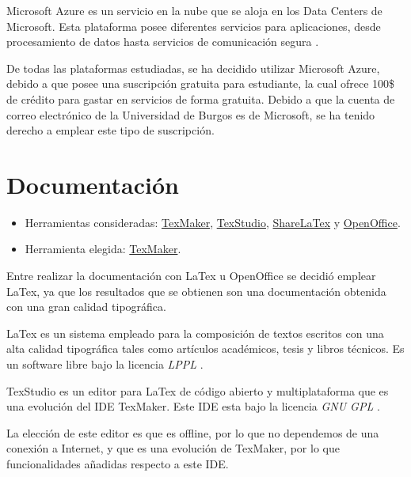 Microsoft Azure es un servicio en la nube que se aloja en los Data Centers de Microsoft. Esta plataforma posee diferentes servicios para aplicaciones, desde procesamiento de datos hasta servicios de comunicación segura \cite{azure:info}.

De todas las plataformas estudiadas, se ha decidido utilizar Microsoft Azure, debido a que posee una suscripción gratuita para estudiante, la cual ofrece 100\$ de crédito para gastar en servicios de forma gratuita. Debido a que la cuenta de correo electrónico de la Universidad de Burgos es de Microsoft, se ha tenido derecho a emplear este tipo de suscripción.

\section{Documentación}

\begin{itemize}
	\tightlist
	\item
	Herramientas consideradas: \href{http://www.xm1math.net/texmaker/}{TexMaker}, \href{https://www.texstudio.org/}{TexStudio}, \href{https://es.sharelatex.com/}{ShareLaTex} y \href{https://www.openoffice.org/es/}{OpenOffice}.
	\item
	Herramienta elegida: \href{http://www.xm1math.net/texmaker/}{TexMaker}.
\end{itemize}

Entre realizar la documentación con LaTex u OpenOffice se decidió emplear LaTex, ya que los resultados que se obtienen son una documentación obtenida con una gran calidad tipográfica.

LaTex es un sistema empleado para la composición de textos escritos con una alta calidad tipográfica tales como artículos académicos, tesis y libros técnicos. Es un software libre bajo la licencia \textit{LPPL} \cite{latex:wiki}.

TexStudio es un editor para LaTex de código abierto y multiplataforma que es una evolución del IDE TexMaker. Este IDE esta bajo la licencia \textit{GNU GPL} \cite{texstudio:wiki}.

La elección de este editor es que es offline, por lo que no dependemos de una conexión a Internet, y que es una evolución de TexMaker, por lo que funcionalidades añadidas respecto a este IDE.

